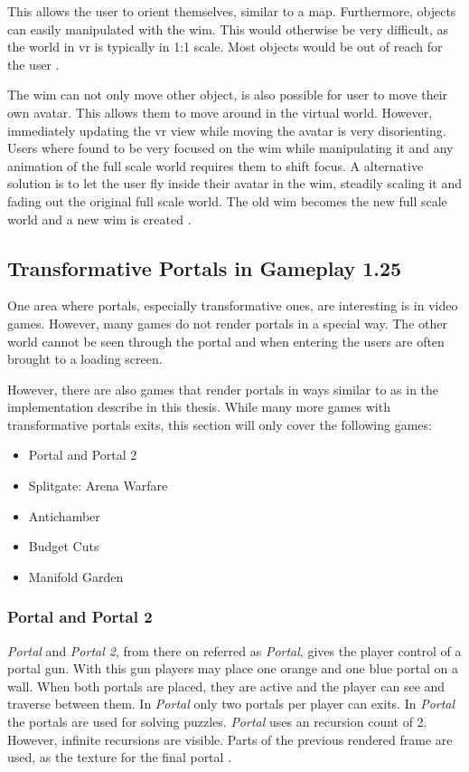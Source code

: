 This allows the user to orient themselves, similar to a map. Furthermore, objects can easily manipulated with the \gls{wim}. This would otherwise be very difficult, as the world in \gls{vr} is typically in 1:1 scale. Most objects would be out of reach for the user \cite{stoakley:1995:virtual}.

The \gls{wim} can not only move other object, is also possible for user to move their own avatar. This allows them to move around in the virtual world. However, immediately updating the \gls{vr} view while moving the avatar is very disorienting. Users where found to be very focused on the \gls{wim} while manipulating it and any animation of the full scale world requires them to shift focus. A alternative solution is to let the user fly inside their avatar in the \gls{wim}, steadily scaling it and fading out the original full scale world. The old \gls{wim} becomes the new full scale world and a new \gls{wim} is created \cite{pausch:1995:navigation}.


\subsection{Transformative Portals in Gameplay 1.25}
One area where portals, especially transformative ones, are interesting is in video games. However, many games do not render portals in a special way. The other world cannot be seen through the portal and when entering the users are often brought to a loading screen. 

However, there are also games that render portals in ways similar to as in the implementation describe in this thesis. While many more games with transformative portals exits, this section will only cover the following games:
\begin{itemize}
	\item Portal and Portal 2
	\item Splitgate: Arena Warfare
	\item Antichamber
	\item Budget Cuts
	\item Manifold Garden
	
	
\end{itemize}

\subsubsection{Portal and Portal 2}
\textit{Portal} and \textit{Portal 2}, from there on referred as \textit{Portal}, gives the player control of a portal gun. With this gun players may place one orange and one blue portal on a wall. When both portals are placed, they are active and the player can see and traverse between them. In \textit{Portal} only two portals per player can exits. In \textit{Portal} the portals are used for solving puzzles. \textit{Portal} uses an recursion count of 2. However, infinite recursions are visible. Parts of the previous rendered frame are used, as the texture for the final portal \cite{lecture:portalProblems}.

